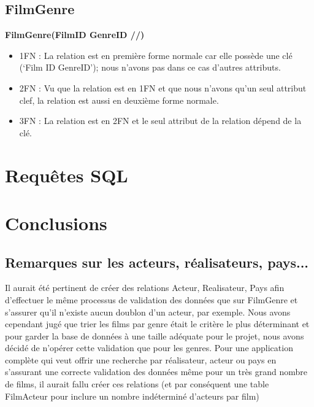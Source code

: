 \documentclass[12pt]{article}
\begin{document}
\subsection{FilmGenre}
\textbf{FilmGenre(FilmID GenreID //)}
\begin{itemize}
    \item 1FN : La relation est en première forme normale car elle possède une clé (‘Film ID GenreID’); nous n’avons pas dans ce cas d’autres attributs. 
    \item 2FN : Vu que la relation est en 1FN et que nous n'avons qu'un seul attribut clef, la relation est aussi
    en deuxième forme normale.
    \item 3FN : La relation est en 2FN et le seul attribut de la relation dépend de la clé.
\end{itemize}
\pagebreak
\section{Requêtes SQL}
\pagebreak
\section{Conclusions}
\subsection{Remarques sur les acteurs, réalisateurs, pays...}
Il aurait été pertinent de créer des relations Acteur, Realisateur, Pays afin d'effectuer le même
processus de validation des données que sur FilmGenre et s'assurer qu'il n'existe aucun doublon d'un acteur, par exemple. 
Nous avons cependant jugé que trier les films par genre était le critère le plus déterminant et pour garder la base de données
à une taille adéquate pour le projet, nous avons décidé de n'opérer cette validation que pour les genres. Pour une application
complète qui veut offrir une recherche par réalisateur, acteur ou pays en s'assurant une correcte validation des données même pour un très
grand nombre de films, il aurait fallu créer ces relations (et par conséquent une table FilmActeur pour inclure un nombre
indéterminé d'acteurs par film)
\end{document}
